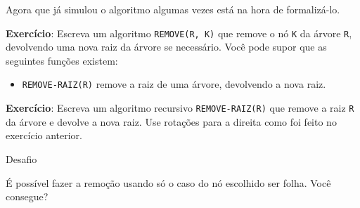 \documentclass[]{article}
\providecommand{\tightlist}{%
  \setlength{\itemsep}{0pt}\setlength{\parskip}{0pt}}
\begin{document}
\begin{adjustwidth}{0pt}{10em}
Agora que já simulou o algoritmo algumas vezes está na hora de
formalizá-lo.

\textbf{Exercício}: Escreva um algoritmo \texttt{REMOVE(R,\ K)} que
remove o nó \texttt{K} da árvore \texttt{R}, devolvendo uma nova raiz da
árvore se necessário. Você pode supor que as seguintes funções existem:

\begin{itemize}
\tightlist
\item
  \texttt{REMOVE-RAIZ(R)} remove a raiz de uma árvore, devolvendo a nova
  raiz.
\end{itemize}

\vspace{15em}

\textbf{Exercício}: Escreva um algoritmo recursivo
\texttt{REMOVE-RAIZ(R)} que remove a raiz \texttt{R} da árvore e devolve
a nova raiz. Use rotações para a direita como foi feito no exercício
anterior.

\begin{boxYellow}{Desafio}

É possível fazer a remoção usando só o caso do nó escolhido ser folha.
Você consegue?

\end{boxYellow}
\end{adjustwidth}
\end{document}
